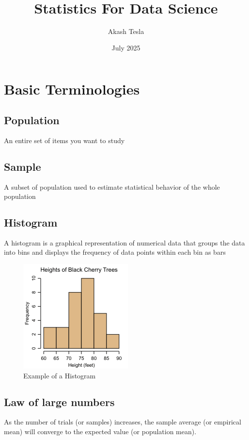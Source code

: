 \documentclass[12pt]{extarticle}
\title{Statistics For Data Science}
\author{Akash Tesla}
\date{July 2025}
\begin{document}
\tableofcontents
\newpage
\maketitle
\section{Basic Terminologies}

\subsection{Population}
An entire set of items you want to study 

\subsection{Sample} 
A subset of population used to estimate statistical behavior of the whole population 

\subsection{Histogram}
A histogram is a graphical representation of numerical data that groups the data into bins and displays the frequency of data points within each bin as bars

\begin{figure}[H]
    \centering
    \includegraphics[width=0.5\linewidth]{images/histogram_example.png}
    \caption{Example of a Histogram}
    \label{fig:1}
\end{figure}


\subsection{Law of large numbers}
As the number of trials (or samples) increases, the sample average (or empirical mean) will converge to the expected value (or population mean).
\end{document}
